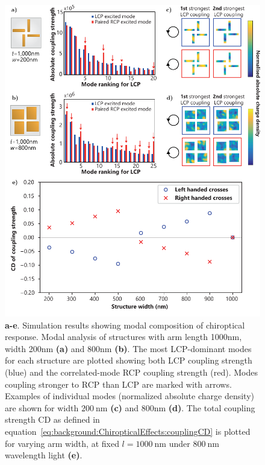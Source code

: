 \begin{figure}[htb!]	
    \centering	
    \includegraphics[scale=1]{./figures/results/EnantiomorphingChiralCrosses/l1000modes.pdf}
    \caption{\label{fig:results:EnantiomorphingChiralCrosses:l1000modes}
    \textbf{a-e}. Simulation results showing modal composition of chiroptical response. Modal analysis of structures with arm length 1000nm, width 200nm \textbf{(a)} and 800nm \textbf{(b)}. The most LCP-dominant modes for each structure are plotted showing both LCP coupling strength (blue) and the correlated-mode RCP coupling strength (red). Modes coupling stronger to RCP than LCP are marked with arrows. Examples of individual modes (normalized absolute charge density) are shown for width $\SI{200}{\nano\m}$ \textbf{(c)} and 800nm \textbf{(d)}. The total coupling strength CD as defined in equation~\ref{eq:background:ChiropticalEffects:couplingCD} is plotted for varying arm width, at fixed $l=\SI{1000}{\nano\m}$ under $\SI{800}{\nano\m}$ wavelength light \textbf{(e)}.}	
\end{figure}

